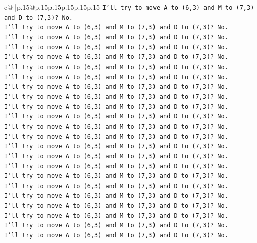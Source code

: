 \documentclass{article}
\begin{document}
{\begin{supertabular}{c@{$\;$}|p{.15\linewidth}@{}p{.15\linewidth}p{.15\linewidth}p{.15\linewidth}p{.15\linewidth}p{.15\linewidth}}
{{{\texttt{I'll try to move A to (6,3) and M to (7,3) and D to (7,3)? No.} \\
\texttt{I'll try to move A to (6,3) and M to (7,3) and D to (7,3)? No.} \\
\texttt{I'll try to move A to (6,3) and M to (7,3) and D to (7,3)? No.} \\
\texttt{I'll try to move A to (6,3) and M to (7,3) and D to (7,3)? No.} \\
\texttt{I'll try to move A to (6,3) and M to (7,3) and D to (7,3)? No.} \\
\texttt{I'll try to move A to (6,3) and M to (7,3) and D to (7,3)? No.} \\
\texttt{I'll try to move A to (6,3) and M to (7,3) and D to (7,3)? No.} \\
\texttt{I'll try to move A to (6,3) and M to (7,3) and D to (7,3)? No.} \\
\texttt{I'll try to move A to (6,3) and M to (7,3) and D to (7,3)? No.} \\
\texttt{I'll try to move A to (6,3) and M to (7,3) and D to (7,3)? No.} \\
\texttt{I'll try to move A to (6,3) and M to (7,3) and D to (7,3)? No.} \\
\texttt{I'll try to move A to (6,3) and M to (7,3) and D to (7,3)? No.} \\
\texttt{I'll try to move A to (6,3) and M to (7,3) and D to (7,3)? No.} \\
\texttt{I'll try to move A to (6,3) and M to (7,3) and D to (7,3)? No.} \\
\texttt{I'll try to move A to (6,3) and M to (7,3) and D to (7,3)? No.} \\
\texttt{I'll try to move A to (6,3) and M to (7,3) and D to (7,3)? No.} \\
\texttt{I'll try to move A to (6,3) and M to (7,3) and D to (7,3)? No.} \\
\texttt{I'll try to move A to (6,3) and M to (7,3) and D to (7,3)? No.} \\
\texttt{I'll try to move A to (6,3) and M to (7,3) and D to (7,3)? No.} \\
\texttt{I'll try to move A to (6,3) and M to (7,3) and D to (7,3)? No.} \\
\texttt{I'll try to move A to (6,3) and M to (7,3) and D to (7,3)? No.} \\
\texttt{I'll try to move A to (6,3) and M to (7,3) and D to (7,3)? No.} \\
\texttt{I'll try to move A to (6,3) and M to (7,3) and D to (7,3)? No.} \\
}}}
\end{supertabular}}
\end{document}
